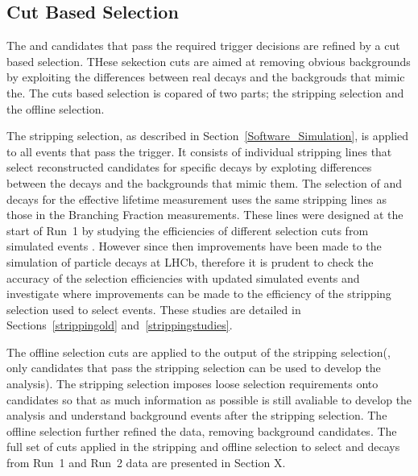 \subsection{Cut Based Selection}
\label{sec:cut_based_sel}
The \bsmumu and \bhh candidates that pass the required trigger decisions are refined by a cut based selection. THese sekection cuts are aimed at removing obvious backgrounds by exploiting the differences between real \bsmumu decays and the backgrouds that mimic the. The cuts based selection is copared of two parts; the stripping selection and the offline selection. 

The stripping selection, as described in Section~\ref{Software_Simulation}, is applied to all events that pass the trigger. It consists of individual stripping lines that select reconstructed candidates for specific decays by exploting differences between the decays and the backgrounds that mimic them. The selection of \bsmumu and \bhh decays for the \bsmumu effective lifetime measurement uses the same stripping lines as those in the \bmumu Branching Fraction measurements. These lines were designed at the start of Run~1 by studying the efficiencies of different selection cuts from simulated events \cite{}. However since then improvements have been made to the simulation of particle decays at LHCb, therefore it is prudent to check the accuracy of the selection efficiencies with updated simulated events and investigate where improvements can be made to the efficiency of the stripping selection used to select \bsmumu events. These studies are detailed in Sections~\ref{strippingold} and~\ref{strippingstudies}.

The offline selection cuts are applied to the output of the stripping selection(, only candidates that pass the stripping selection can be used to develop the analysis). The stripping selection imposes loose selection requirements onto \bsmumu candidates so that as much information as possible is still avaliable to develop the analysis and understand background events after the stripping selection. The offline selection further refined the data, removing background candidates. The full set of cuts applied in the stripping and offline selection to select \bsmumu and \bhh decays from Run~1 and Run~2 data are presented in Section X. 



